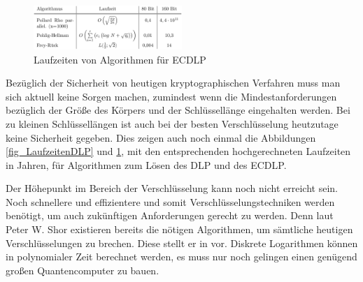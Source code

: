 	\begin{figure}
		\centering
		\includegraphics[width=0.5\textwidth]{includes/images/LaufzeitenECDLP.PNG}
		\caption{Laufzeiten von Algorithmen für ECDLP~\cite{DLP:ECDLP:Probleme:und:Loesungen}}
		\label{fig_LaufzeitenECDLP}
	\end{figure}

	Bezüglich der Sicherheit von heutigen kryptographischen Verfahren muss man sich aktuell keine Sorgen machen, zumindest wenn die Mindestanforderungen bezüglich der Größe des Körpers und der Schlüssellänge eingehalten werden. Bei zu kleinen Schlüssellängen ist auch bei der besten Verschlüsselung heutzutage keine Sicherheit gegeben. Dies zeigen auch noch einmal die Abbildungen \ref{fig_LaufzeitenDLP} und \ref{fig_LaufzeitenECDLP}, mit den entsprechenden hochgerechneten Laufzeiten in Jahren, für Algorithmen zum Lösen des DLP und des ECDLP.
	
	Der Höhepunkt im Bereich der Verschlüsselung kann noch nicht erreicht sein. Noch schnellere und effizientere und somit  Verschlüsselungstechniken werden benötigt, um auch zukünftigen Anforderungen gerecht zu werden. Denn laut Peter W. Shor existieren bereits die nötigen Algorithmen, um sämtliche heutigen Verschlüsselungen zu brechen. Diese stellt er in \cite{Algorithms:for:Quantum:Computation:Discrete:Logarithms:and:Factoring} vor. Diskrete Logarithmen können in polynomialer Zeit berechnet werden, es muss nur noch gelingen einen genügend großen Quantencomputer zu bauen.